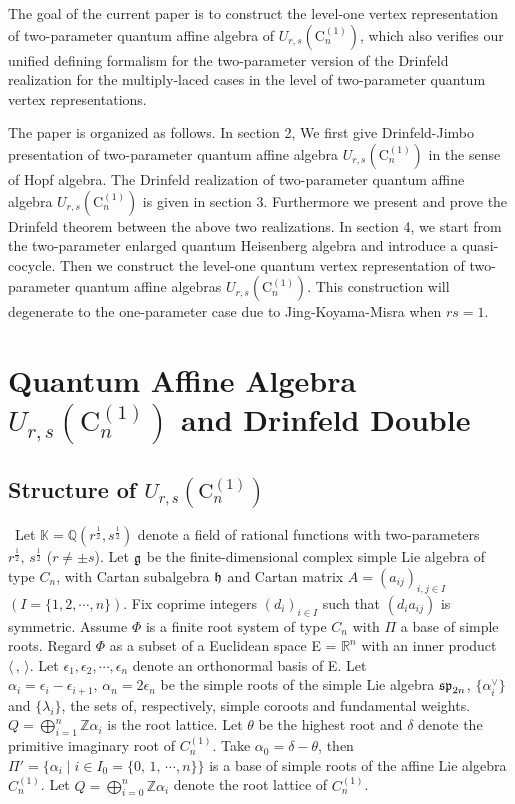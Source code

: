 \documentclass{amsproc}
\theoremstyle{remark}
\numberwithin{equation}{section}
\begin{document}
The goal of the current paper is to construct the level-one vertex representation
of two-parameter quantum affine algebra of ${U}_{r,s}(\mathrm{C}_n^{(1)})$, which also verifies our unified defining formalism for the two-parameter version of the Drinfeld realization
for the multiply-laced cases in the level of two-parameter quantum vertex representations.

The paper is organized as follows. In section 2, We first give Drinfeld-Jimbo presentation of
two-parameter quantum affine algebra ${U}_{r,s}(\mathrm{C}_n^{(1)})$ in the sense of Hopf algebra.
The Drinfeld realization of two-parameter quantum affine algebra
${U}_{r,s}(\mathrm{C}_n^{(1)})$ is given in section 3.
Furthermore we present and prove the Drinfeld theorem between the above two realizations.
In section 4, we start from the two-parameter enlarged quantum Heisenberg algebra and introduce a quasi-cocycle. Then we
construct the level-one quantum vertex representation of two-parameter
quantum affine algebras ${U}_{r,s}(\mathrm{C}_n^{(1)})$. This construction will degenerate to the one-parameter case due to Jing-Koyama-Misra \cite{JKM2} when $rs=1$.

\section{Quantum Affine Algebra ${U}_{r,s}(\mathrm{C}_n^{(1)})$ and Drinfeld Double}

\subsection{Structure of $U_{r,s}(\mathrm{C}_n^{(1)})$}\,
Let $\mathbb{K}=\mathbb{Q}(r^{\frac1{2}},s^{\frac1{2}})$ denote a field of rational functions
with two-parameters $r^{\frac1{2}},\,s^{\frac1{2}}$ ($r\ne \pm s$).
Let $\frak{g}$ be the finite-dimensional complex simple Lie algebra of type $C_n$,
  with Cartan subalgebra $\frak{h}$ and Cartan matrix $A=(a_{ij})_{i,j\in I}$ $(I=\{1, 2,\cdots, n\})$.
Fix coprime integers
  $(d_i)_{i\in I}$ such that $(d_ia_{ij})$ is symmetric.
Assume $\Phi$ is a finite root system of type $C_n$ with
$\Pi$ a base of simple roots. Regard $\Phi$ as a subset of a
Euclidean space E = ${\mathbb R}^n$ with an inner product $\langle
\, ,\, \rangle$. Let $\epsilon _{1},\epsilon _{2}, \cdots, \epsilon_{n}$
denote an orthonormal basis of E.
    Let $\alpha_{i}
= \epsilon_{i}-\epsilon_{i+1},\,\alpha_{n} =2\epsilon_{n}$ be the simple roots of the simple Lie algebra $\frak{sp}_{2n}$,
$\{ \alpha_i^\vee \}$ and $\{ \lambda_i\}$, the sets of, respectively, simple coroots and fundamental weights.
$Q = \bigoplus_{i=1}^{n}\mathbb{Z}\alpha_i$
is the root lattice.
Let $\theta$ be the highest root and $\delta$ denote the primitive imaginary root of $C_n^{(1)}$. Take
$\alpha_0=\delta-\theta$, then $\Pi'=\{\alpha_i\mid
i\in I_0=\{0,\,1,\,\cdots, n\}\}$ is a base of simple roots of the affine Lie
algebra ${C_n^{(1)}}$. Let
$\widehat{Q}=\bigoplus_{i=0}^{n}\mathbb{Z}\alpha_i$ denote the root lattice of ${C_n^{(1)}}$.
\end{document}
